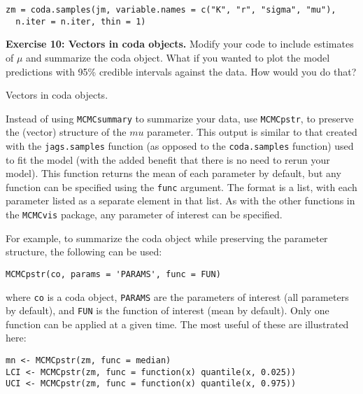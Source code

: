 \documentclass[12pt,english]{article}
\begin{document}
\begin{Verbatim}
zm = coda.samples(jm, variable.names = c("K", "r", "sigma", "mu"), 
  n.iter = n.iter, thin = 1)
\end{Verbatim}


\bigskip
\belowcaptionskip=-40pt
\begin{exercise}
\begin{mdframed}
\doublespacing
\textbf{Exercise 10: Vectors in coda objects.} Modify your code to include estimates of $\mu$ and summarize the coda object. What if you wanted to plot the model predictions with 95\% credible intervals against the data. How would you do that?
\end{mdframed}
\captionsetup{textformat=empty, labelformat=empty}
\caption[Vectors in coda objects]{Vectors in coda objects.}
\label{ex:coda vectors}
\end{exercise}
\belowcaptionskip=0pt


Instead of using \texttt{MCMCsummary} to summarize your data, use \texttt{MCMCpstr}, to preserve the (vector) structure of the $mu$ parameter. This output is similar to that created with the \texttt{jags.samples} function (as opposed to the \texttt{coda.samples} function) used to fit the model (with the added benefit that there is no need to rerun your model). This function returns the mean of each parameter by default, but any function can be specified using the \texttt{func} argument. The format is a list, with each parameter listed as a separate element in that list. As with the other functions in the \texttt{MCMCvis} package, any parameter of interest can be specified.

For example, to summarize the coda object while preserving the parameter structure, the following can be used:


\begin{Verbatim}
MCMCpstr(co, params = 'PARAMS', func = FUN)
\end{Verbatim}

\noindent where \texttt{co} is a coda object, \texttt{PARAMS} are the parameters of interest (all parameters by default), and \texttt{FUN} is the function of interest (mean by default). Only one function can be applied at a given time. The most useful of these are illustrated here:

\begin{Verbatim}
mn <- MCMCpstr(zm, func = median)
LCI <- MCMCpstr(zm, func = function(x) quantile(x, 0.025))
UCI <- MCMCpstr(zm, func = function(x) quantile(x, 0.975))
\end{Verbatim}
\end{document}
